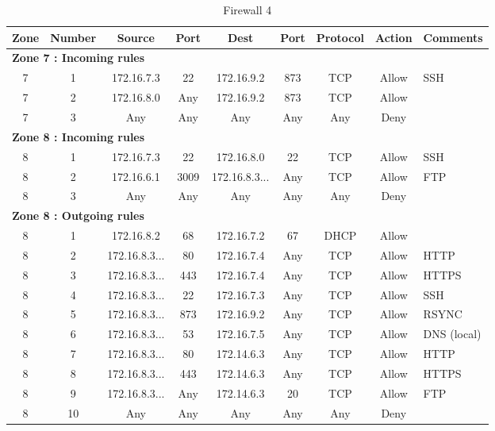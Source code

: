 \documentclass[a4paper,titlepage]{article}
\begin{document}

\begin{table}[h]
	\center
	\begin{tabular}{c|c|cc|cc|ccl}
		Zone & Number & Source & Port & Dest & Port & Protocol & Action & \multicolumn{1}{c}{Comments}\\
		\hline
		\multicolumn{9}{l}{\textbf{Zone 7 : Incoming rules}}\\
		7 & 1 & 172.16.7.3 & 22 & 172.16.9.2 & 873 & TCP & Allow & SSH\\
		7 & 2 & 172.16.8.0 & Any & 172.16.9.2 & 873 & TCP & Allow & \\
		7 & 3 & Any & Any & Any & Any & Any & Deny & \\

		\hline
		\multicolumn{9}{l}{\textbf{Zone 8 : Incoming rules}}\\
		8 & 1 & 172.16.7.3 & 22 & 172.16.8.0 & 22 & TCP & Allow & SSH \\
		8 & 2 & 172.16.6.1 & 3009 & 172.16.8.3... & Any & TCP & Allow & FTP \\
		8 & 3 & Any & Any & Any & Any & Any & Deny & \\
		\hline
		\multicolumn{9}{l}{\textbf{Zone 8 : Outgoing rules}}\\
		8 & 1 & 172.16.8.2 & 68 & 172.16.7.2 & 67 & DHCP & Allow & \\
		8 & 2 & 172.16.8.3... & 80 & 172.16.7.4 & Any & TCP & Allow & HTTP \\
		8 & 3 & 172.16.8.3... & 443 & 172.16.7.4 & Any & TCP & Allow & HTTPS \\
		8 & 4 & 172.16.8.3... & 22 & 172.16.7.3 & Any & TCP & Allow & SSH \\
		8 & 5 & 172.16.8.3... & 873 & 172.16.9.2 & Any & TCP & Allow & RSYNC \\
		8 & 6 & 172.16.8.3... & 53 & 172.16.7.5 & Any & TCP & Allow & DNS (local) \\
		8 & 7 & 172.16.8.3... & 80 & 172.14.6.3 & Any & TCP & Allow & HTTP \\
		8 & 8 & 172.16.8.3... & 443 & 172.14.6.3 & Any & TCP & Allow & HTTPS \\
		8 & 9 & 172.16.8.3... & Any & 172.14.6.3 & 20 & TCP & Allow & FTP \\
		8 & 10 & Any & Any & Any & Any & Any & Deny & \\
		\hline
		
	\end{tabular}
	\caption{Firewall 4}
\end{table}
\end{document}
